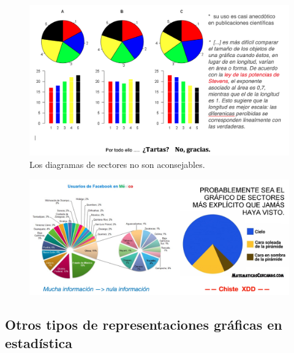 	\begin{figure}[H]
			\centering
			\includegraphics[width=1\textwidth]{imagenes/imagenes01/T01IM06.png}
			\caption*{\footnotesize{Los diagramas de sectores no son aconsejables.}}
		\end{figure}

	\begin{figure}[H]
			\centering
			\includegraphics[width=1\textwidth]{imagenes/imagenes01/T01IM07.png}
		\end{figure}


\subsection{Otros tipos de representaciones gráficas en estadística}

